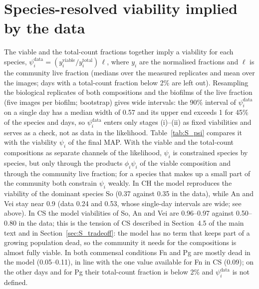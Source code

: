 \documentclass[11pt,a4paper]{article}
\begin{document}
\section{Species-resolved viability implied by the data}
\label{sec:S_psi}
The viable and the total-count fractions together imply a viability for each species, $\psi_i^{\mathrm{data}}=(y_i^{\mathrm{viable}}/y_i^{\mathrm{total}})\,\ell$, where $y_i$ are the normalised fractions and $\ell$ is the community live fraction (medians over the measured replicates and mean over the images; days with a total-count fraction below 2\% are left out).
Resampling the biological replicates of both compositions and the biofilms of the live fraction (five images per biofilm; bootstrap) gives wide intervals: the 90\% interval of $\psi_i^{\mathrm{data}}$ on a single day has a median width of 0.57 and its upper end exceeds 1 for 45\% of the species and days, so $\psi_i^{\mathrm{data}}$ enters only stages (i)--(ii) as fixed viabilities and serves as a check, not as data in the likelihood.
Table~\ref{tab:S_psi} compares it with the viability $\psi_i$ of the final MAP.
With the viable and the total-count compositions as separate channels of the likelihood, $\psi_i$ is constrained species by species, but only through the products $\phi_i\psi_i$ of the viable composition and through the community live fraction; for a species that makes up a small part of the community both constrain $\psi_i$ weakly.
In CH the model reproduces the viability of the dominant species So (0.37 against 0.35 in the data), while An and Vei stay near 0.9 (data 0.24 and 0.53, whose single-day intervals are wide; see above).
In CS the model viabilities of So, An and Vei are 0.96--0.97 against 0.50--0.80 in the data; this is the tension of CS described in Section~4.5 of the main text and in Section~\ref{sec:S_tradeoff}: the model has no term that keeps part of a growing population dead, so the community it needs for the compositions is almost fully viable.
In both commensal conditions Fn and Pg are mostly dead in the model (0.05--0.11), in line with the one value available for Fn in CS (0.09); on the other days and for Pg their total-count fraction is below 2\% and $\psi_i^{\mathrm{data}}$ is not defined.

\begin{table}[h]
\centering
\caption{Viability of each species: implied by the data, $\psi_i^{\mathrm{data}}$ (median over days 3--21), and of the final MAP, $\psi_i$ (median over the same days). Data: \texttt{tools/psi\_from\_data.py}; model: MAP of the seed with the highest maximum log-likelihood, \texttt{tools/psi\_table\_runs.py}; --: total-count fraction below 2\% on every day.}
\label{tab:S_psi}
\footnotesize\setlength{\tabcolsep}{3.5pt}

\end{table}
\end{document}
